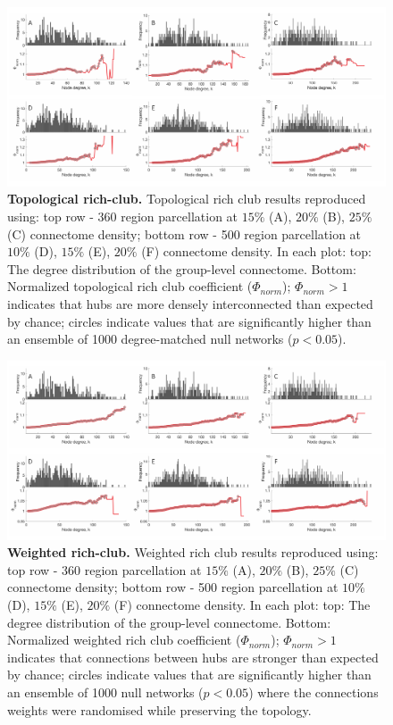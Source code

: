 \begin{figure}[h!]
\begin{center}
\includegraphics[width=1\textwidth]{Chapter5/SFigure1.pdf}%
\end{center}
\caption{\textbf{Topological rich-club.} 
Topological rich club results reproduced using: top row - 360 region parcellation at $15\%$ (A), $20\%$ (B), $25\%$ (C) connectome density; bottom row - 500 region parcellation at $10\%$ (D), $15\%$ (E), $20\%$ (F) connectome density. In each plot: top: The degree distribution of the group-level connectome. Bottom: Normalized topological rich club coefficient ($\Phi_{norm}$); $\Phi_{norm}>1$ indicates that hubs are more densely interconnected than expected by chance; circles indicate values that are significantly higher than an ensemble of 1000 degree-matched null networks ($p<0.05$).}
\label{fig:Ch5SFig1}
\end{figure}

\begin{figure}[h!]
\begin{center}
\includegraphics[width=1\textwidth]{Chapter5/SFigure2.pdf}%
\end{center}
\caption{\textbf{Weighted rich-club.} 
Weighted rich club results reproduced using: top row - 360 region parcellation at $15\%$ (A), $20\%$ (B), $25\%$ (C) connectome density; bottom row - 500 region parcellation at $10\%$ (D), $15\%$ (E), $20\%$ (F) connectome density. In each plot: top: The degree distribution of the group-level connectome. Bottom: Normalized weighted rich club coefficient ($\Phi_{norm}$); $\Phi_{norm}>1$ indicates that connections between hubs are stronger than expected by chance; circles indicate values that are significantly higher than an ensemble of 1000 null networks ($p<0.05$) where the connections weights were randomised while preserving the topology. }
\label{fig:Ch5SFig2}
\end{figure}

